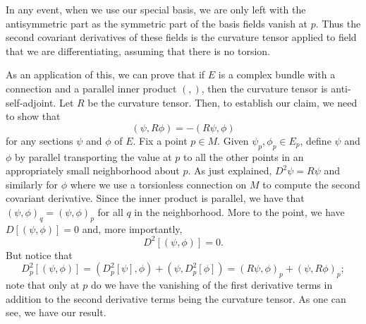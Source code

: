 \documentclass[11pt]{article}
\theoremstyle{remark}
\begin{document}
In any event, when we use our special basis, we are only left with the
antisymmetric part  as the symmetric part of
the basis fields vanish at $p$. Thus the second covariant derivatives of these
fields is the curvature tensor applied to field that we are
differentiating, assuming that there is no torsion. 

As an application of this, we can prove that if $E$ is a complex
bundle with a connection and a parallel inner product $\ensuremath{({}, {})}$,
then the curvature tensor is anti-self-adjoint. Let $R$ be the
curvature tensor. Then, to establish our claim, we need to show that 
\[
\ensuremath{({\ensuremath{\psi}}, {R\phi})} = - \ensuremath{({R \ensuremath{\psi}}, {\phi})}
\]
for any sections $\ensuremath{\psi}$ and $\phi$ of $E$. Fix a point $p \in M$. 
Given $\ensuremath{\psi}_p, \phi_p \in
E_p$, define $\ensuremath{\psi}$ and $ \phi$  by parallel transporting the value at
$p$ to all the other points in an appropriately small neighborhood
about $p$. As just explained, $D^2 \ensuremath{\psi} = R\ensuremath{\psi}$ and similarly for
$\phi$ where we use a torsionless connection on $M$ to compute the
second covariant derivative. Since the inner product is parallel, we
have that $\ensuremath{({\ensuremath{\psi}}, {\phi})}_q = \ensuremath{({\ensuremath{\psi}}, {\phi})}_p$ for all $q$ in the
neighborhood. More to the point, we have $D[\ensuremath{({\ensuremath{\psi}}, {\phi})}] =0$ and,
more importantly, 
\[
D^2 [\ensuremath{({\ensuremath{\psi}}, {\phi})}] = 0.
\]
But notice that 
\[
D^2_p[\ensuremath{({\ensuremath{\psi}}, {\phi})}] = \ensuremath{({D_p^2[\ensuremath{\psi}]}, {\phi})} + \ensuremath{({\ensuremath{\psi}}, {D_p^2[\phi]})}
= \ensuremath{({R \ensuremath{\psi}}, {\phi})}_p + \ensuremath{({\ensuremath{\psi}}, {R\phi})}_p;
\]
note that only at $p$ do we have the vanishing of the first derivative
terms in addition to the second derivative terms being the curvature tensor. 
As one can see, we have our result.

\clearpage


\end{document}
